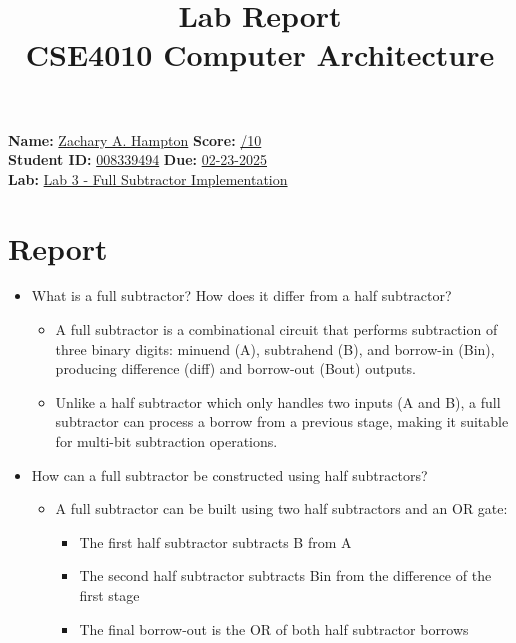 \documentclass[a4paper,12pt]{article}
\title{Lab Report\\ CSE4010 Computer Architecture}
\author{}
\date{}
\begin{document}
\maketitle

\noindent \textbf{Name:} \underline{Zachary A. Hampton\hspace{5cm}} \hfill \textbf{Score:} \underline{\hspace{2cm}/10} \\
\textbf{Student ID:} \underline{008339494\hspace{6cm}} \hfill \textbf{Due:} \underline{02-23-2025} \\
\textbf{Lab:} \underline{Lab 3 - Full Subtractor Implementation\hspace{6cm}}

\section*{Report}
\begin{itemize}
    \item What is a full subtractor? How does it differ from a half subtractor?
    \begin{itemize}
        \item A full subtractor is a combinational circuit that performs subtraction of three binary digits: minuend (A), subtrahend (B), and borrow-in (Bin), producing difference (diff) and borrow-out (Bout) outputs.
        \item Unlike a half subtractor which only handles two inputs (A and B), a full subtractor can process a borrow from a previous stage, making it suitable for multi-bit subtraction operations.
    \end{itemize}
    
    \item How can a full subtractor be constructed using half subtractors?
    \begin{itemize}
        \item A full subtractor can be built using two half subtractors and an OR gate:
        \begin{itemize}
            \item The first half subtractor subtracts B from A
            \item The second half subtractor subtracts Bin from the difference of the first stage
            \item The final borrow-out is the OR of both half subtractor borrows
        \end{itemize}
    \end{itemize}
\end{itemize}
\end{document}
